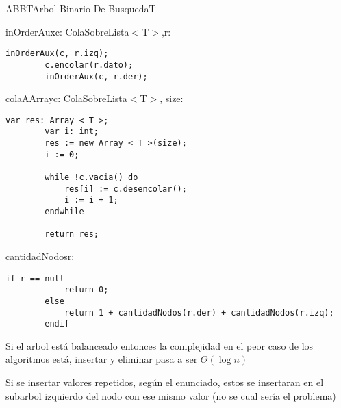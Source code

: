 \begin{module}{ABB}{T}{Arbol Binario De Busqueda}{T}
\begin{proc}{inOrderAux}{\Inout c: ColaSobreLista$<$T$>$,\In r: \nodo}{}
\begin{lstlisting}[numbers=none,frame=none]
		inOrderAux(c, r.izq);
		c.encolar(r.dato);
		inOrderAux(c, r.der);
		\end{lstlisting}
	\end{proc}

	\pagebreak

	\begin{proc}{colaAArray}{\Inout c: ColaSobreLista$<$T$>$, \In size: \Int}{}
		\begin{lstlisting}[numbers=none,frame=none]
		var res: Array < T >;
		var i: int;
		res := new Array < T >(size);
		i := 0;

		while !c.vacia() do
			res[i] := c.desencolar();
			i := i + 1;
		endwhile

		return res;
		\end{lstlisting}
	\end{proc}

	\begin{proc}{cantidadNodos}{\In r: \nodo}{\Int}
		\begin{lstlisting}[numbers=none,frame=none]
		if r == null
			return 0;
		else
			return 1 + cantidadNodos(r.der) + cantidadNodos(r.izq);
		endif
		\end{lstlisting}
	\end{proc}
\end{module}

Si el arbol está balanceado entonces la complejidad en el peor caso de los algoritmos está, insertar y eliminar pasa a ser $\Theta(\log{n})$
\medskip

Si se insertar valores repetidos, según el enunciado, estos se insertaran en el subarbol izquierdo del nodo con ese mismo valor (no se cual sería el problema)

